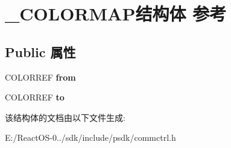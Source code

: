 \hypertarget{struct___c_o_l_o_r_m_a_p}{}\section{\+\_\+\+C\+O\+L\+O\+R\+M\+A\+P结构体 参考}
\label{struct___c_o_l_o_r_m_a_p}
\subsection*{Public 属性}
\begin{DoxyCompactItemize}
\item 
\mbox{\label{struct___c_o_l_o_r_m_a_p_af7f998fca33eeeefad171e4afc0bed5f}} 
C\+O\+L\+O\+R\+R\+EF {\bfseries from}
\item 
\mbox{\label{struct___c_o_l_o_r_m_a_p_a3fde714134dbaca04ed35d7c3af6d205}} 
C\+O\+L\+O\+R\+R\+EF {\bfseries to}
\end{DoxyCompactItemize}


该结构体的文档由以下文件生成\+:\begin{DoxyCompactItemize}
\item 
E\+:/\+React\+O\+S-\/0../sdk/include/psdk/commctrl.\+h\end{DoxyCompactItemize}
